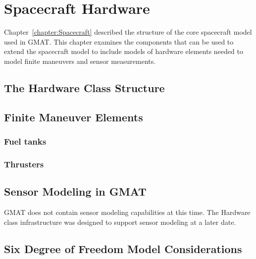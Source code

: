 \chapter{\label{chapter:Hardware}Spacecraft Hardware}

Chapter~\ref{chapter:Spacecraft} described the structure of the core spacecraft model used in GMAT.
This chapter examines the components that can be used to extend the spacecraft model to include
models of hardware elements needed to model finite maneuvers and sensor measurements.

\section{The Hardware Class Structure}

\section{Finite Maneuver Elements}

\subsection{Fuel tanks}

\subsection{Thrusters}

\section{Sensor Modeling in GMAT}

GMAT does not contain sensor modeling capabilities at this time.  The Hardware class infrastructure
was designed to support sensor modeling at a later date.

\section{Six Degree of Freedom Model Considerations}
